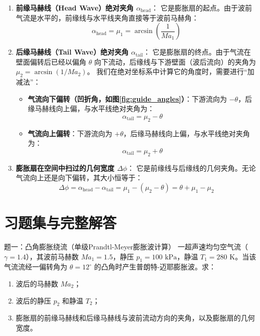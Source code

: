 \documentclass[11pt,a4paper]{ctexart}
\begin{document}
\begin{enumerate}
    \item \textbf{前缘马赫线（Head Wave）绝对夹角 $\alpha_{\text{head}}$}：
    它是膨胀扇的起点。由于波前气流是水平的，前缘线与水平线夹角直接等于波前马赫角：
    \begin{equation}
        \alpha_{\text{head}} = \mu_1 = \arcsin\left(\frac{1}{Ma_1}\right)
    \end{equation}

    \item \textbf{后缘马赫线（Tail Wave）绝对夹角 $\alpha_{\text{tail}}$}：
    它是膨胀扇的终点。由于气流在壁面偏转后已经以偏角 $\theta$ 向下流动，后缘线与下游壁面（波后流向）的夹角为 $\mu_2 = \arcsin(1/Ma_2)$。
    我们在绝对坐标系中计算它的角度时，需要进行“加减法”：
    \begin{itemize}
        \item \textbf{气流向下偏转（凹折角，如图\ref{fig:guide_angles}）}：下游流向为 $-\theta$，后缘马赫线向上偏，与水平线绝对夹角为：
        \begin{equation}
            \alpha_{\text{tail}} = \mu_2 - \theta
        \end{equation}
        \item \textbf{气流向上偏转}：下游流向为 $+\theta$，后缘马赫线向上偏，与水平线绝对夹角为：
        \begin{equation}
            \alpha_{\text{tail}} = \mu_2 + \theta
        \end{equation}
    \end{itemize}

    \item \textbf{膨胀扇在空间中扫过的几何宽度 $\Delta\phi$}：
    它是前缘线与后缘线的几何夹角。无论气流向上还是向下偏转，其大小恒等于：
    \begin{equation}
        \Delta\phi = \alpha_{\text{head}} - \alpha_{\text{tail}} = \mu_1 - (\mu_2 - \theta) = \theta + \mu_1 - \mu_2
    \end{equation}
\end{enumerate}

\newpage

\section{习题集与完整解答}

\begin{questionbox}{题一：凸角膨胀绕流（单级Prandtl-Meyer膨胀波计算）}
一超声速均匀空气流（$\gamma = 1.4$），其波前马赫数 $Ma_1 = 1.5$，静压 $p_1 = 100\text{ kPa}$，静温 $T_1 = 280\text{ K}$。当该气流流经一偏转角为 $\theta = 12^\circ$ 的凸角时产生普朗特-迈耶膨胀波。求：
\begin{enumerate}
    \item 波后的马赫数 $Ma_2$；
    \item 波后的静压 $p_2$ 和静温 $T_2$；
    \item 膨胀扇的前缘马赫线和后缘马赫线与波前流动方向的夹角，以及膨胀扇的几何宽度。
\end{enumerate}
\end{questionbox}
\end{document}
